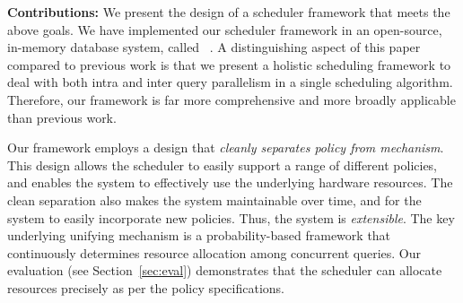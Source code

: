 %
\textbf{Contributions:} We present the design of a scheduler framework that meets the above goals. 
We have implemented our scheduler framework in an open-source, in-memory database system, called \sys{}~\cite{quickstep}.
A distinguishing aspect of this paper compared to previous work
is that we present a holistic scheduling framework to deal with both intra and inter query parallelism in a single scheduling algorithm. 
Therefore, our framework is far more comprehensive and more broadly applicable than previous work.

Our framework employs a design that \textit{cleanly separates policy from mechanism}. 
This design allows the scheduler to easily support a range of different policies, and enables the system to effectively use the underlying hardware resources. 
The clean separation also makes the system maintainable over time, and for the system to easily incorporate new policies. 
Thus, the system is \textit{extensible}. 
The key underlying unifying mechanism is a probability-based framework that continuously determines resource allocation among concurrent queries.
Our evaluation (see Section~\ref{sec:eval}) demonstrates that the scheduler can allocate resources precisely as per the policy specifications. 

